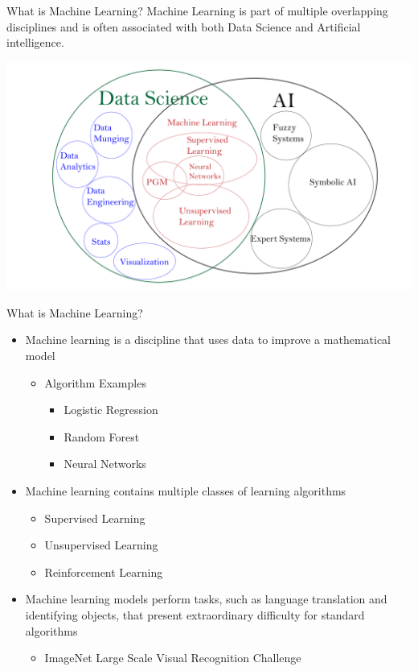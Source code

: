 \documentclass[10pt]{beamer}
\begin{document}
\begin{frame}{What is Machine Learning?}
Machine Learning is part of multiple overlapping disciplines and is often associated with both Data Science and Artificial intelligence.
	\begin{center}
		\includegraphics[width=1.2\textwidth, center, trim=-8cm -8cm 0 0cm]{images/overlapping_dis.pdf}
	\end{center}
\end{frame}

\begin{frame}{What is Machine Learning?}
\pause
	\begin{itemize}
		\item Machine learning is a discipline that uses data to improve a mathematical model
		\pause
			\begin{itemize}
				\item Algorithm Examples
					\begin{itemize}
						\item Logistic Regression
						\item Random Forest
						\item Neural Networks
					\end{itemize}
			\end{itemize}
		  \pause
		\item Machine learning contains multiple classes of learning algorithms
			\begin{itemize}
				\item Supervised Learning
				\item Unsupervised Learning
				\item Reinforcement Learning
			\end{itemize}
		  \pause
		\item Machine learning models perform tasks, such as language translation and identifying objects, that present extraordinary difficulty for standard algorithms
			\begin{itemize}
				\item ImageNet Large Scale Visual Recognition Challenge 
			\end{itemize}
		
	\end{itemize}
\end{frame}
\end{document}
